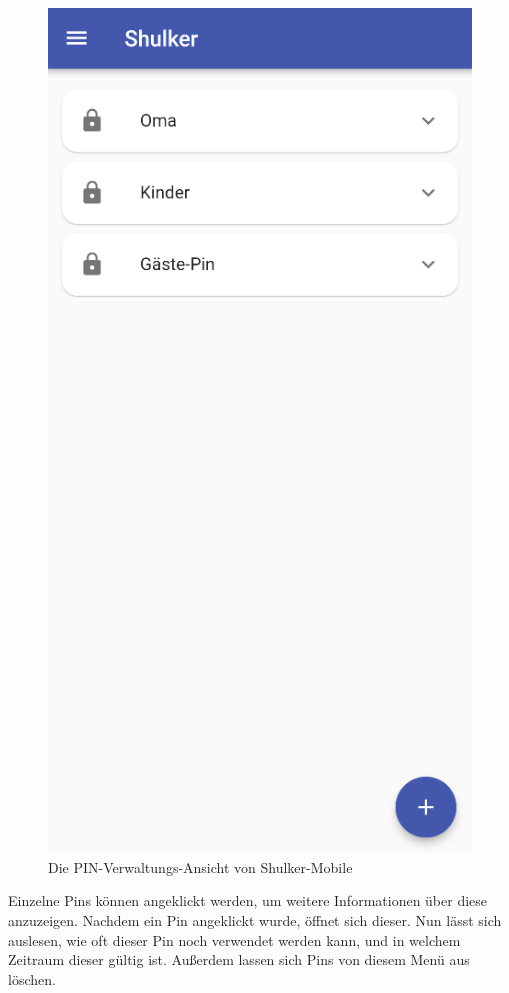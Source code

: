 \begin{figure}[H]
    \begin{center}
        \includegraphics[width=.6\textwidth]{images/mobile/PinManager.png}
        \caption{Die PIN-Verwaltungs-Ansicht von Shulker-Mobile}
    \end{center}
\end{figure}

Einzelne Pins können angeklickt werden, um weitere Informationen über diese anzuzeigen.
Nachdem ein Pin angeklickt wurde, öffnet sich dieser.
Nun lässt sich auslesen, wie oft dieser Pin noch verwendet werden kann, und in welchem 
Zeitraum dieser gültig ist.
Außerdem lassen sich Pins von diesem Menü aus löschen.

